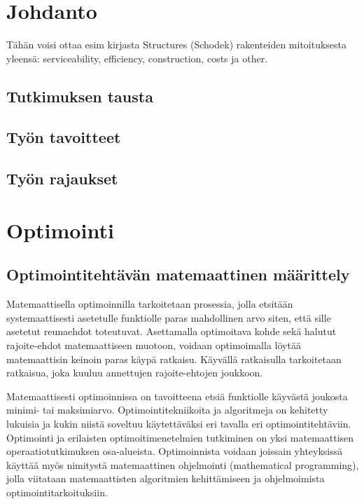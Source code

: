 \documentclass[12pt]{article}
\newenvironment{content}{\pagenumbering{arabic}}{}
\begin{document}
\begin{content}


\section{Johdanto}

Tähän voisi ottaa esim kirjasta Structures (Schodek) rakenteiden mitoituksesta yleensä: serviceability, efficiency, construction, costs ja other.

\subsection{Tutkimuksen tausta}
\subsection{Työn tavoitteet}
\subsection{Työn rajaukset}

\section{Optimointi}
\subsection{Optimointitehtävän matemaattinen määrittely}

Matemaattisella optimoinnilla tarkoitetaan prosessia, jolla etsitään systemaattisesti asetetulle funktiolle paras mahdollinen arvo siten, että sille asetetut reunaehdot toteutuvat. Asettamalla optimoitava kohde sekä halutut rajoite-ehdot matemaattiseen muotoon, voidaan optimoimalla löytää matemaattisin keinoin paras käypä ratkaisu. Käyvällä ratkaisulla tarkoitetaan ratkaisua, joka kuuluu annettujen rajoite-ehtojen joukkoon. 

Matemaattisesti optimoinnissa on tavoitteena etsiä funktiolle käyvästä joukosta minimi- tai maksimiarvo. Optimointitekniikoita ja algoritmeja on kehitetty lukuisia ja kukin niistä soveltuu käytettäväksi eri tavalla eri optimointitehtäviin. Optimointi ja erilaisten optimoitimenetelmien tutkiminen on yksi matemaattisen operaatiotutkimuksen osa-alueista. Optimoinnista voidaan joissain yhteyksissä käyttää myös nimitystä matemaattinen ohjelmointi (mathematical programming), jolla viitataan matemaattisten algoritmien kehittämiseen ja ohjelmoimista optimointitarkoituksiin.  \parencite[1]{rao}


\end{content}
\end{document}
